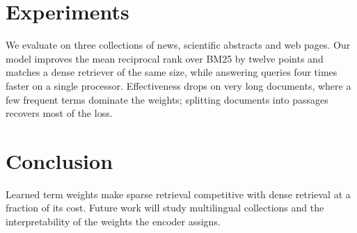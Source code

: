 \documentclass[10pt,twocolumn]{article}
\begin{document}
\section{Experiments}
We evaluate on three collections of news, scientific abstracts and web pages. Our model improves the mean reciprocal rank over BM25 by twelve points and matches a dense retriever of the same size, while answering queries four times faster on a single processor. Effectiveness drops on very long documents, where a few frequent terms dominate the weights; splitting documents into passages recovers most of the loss.

\section{Conclusion}
Learned term weights make sparse retrieval competitive with dense retrieval at a fraction of its cost. Future work will study multilingual collections and the interpretability of the weights the encoder assigns.
\end{document}
